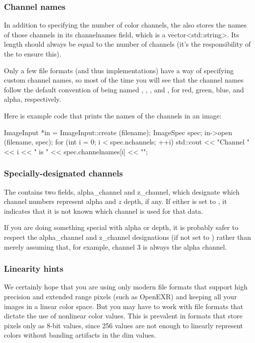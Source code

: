 \subsubsection{Channel names}

In addition to specifying the number of color channels, the
\ImageSpec also stores the names of those channels in its {\cf
  channelnames} field, which is a {\cf vector<std::string>}.  Its length
should always be equal to the number of channels (it's the
responsibility of the \ImageInput to ensure this).

Only a few file formats (and thus \ImageInput implementations) have a
way of specifying custom channel names, so most of the time you will see
that the channel names follow the default convention of being named
, , , and , for red, green, blue, and alpha,
respectively.

Here is example code that prints the names of the channels in an image:

\begin{code}
        ImageInput *in = ImageInput::create (filename);
        ImageSpec spec;
        in->open (filename, spec);
        for (int i = 0;  i < spec.nchannels;  ++i)
            std::cout << "Channel " << i << " is " 
                      << spec.channelnames[i] << "\n";
\end{code}

\subsubsection{Specially-designated channels}

The \ImageSpec contains two fields, {\cf alpha_channel} and {\cf
  z_channel}, which designate which channel numbers represent alpha and
$z$ depth, if any.  If either is set to {}, it indicates that it
is not known which channel is used for that data.

If you are doing something special with alpha or depth, it is probably
safer to respect the {\cf alpha_channel} and {\cf z_channel}
designations (if not set to {}) rather than merely assuming that,
for example, channel 3 is always the alpha channel.

\subsubsection{Linearity hints}

We certainly hope that you are using only modern file formats that
support high precision and extended range pixels (such as OpenEXR) and
keeping all your images in a linear color space.  But you may have to
work with file formats that dictate the use of nonlinear color values.
This is prevalent in formats that store pixels only as 8-bit values,
since 256 values are not enough to linearly represent colors without
banding artifacts in the dim values.

